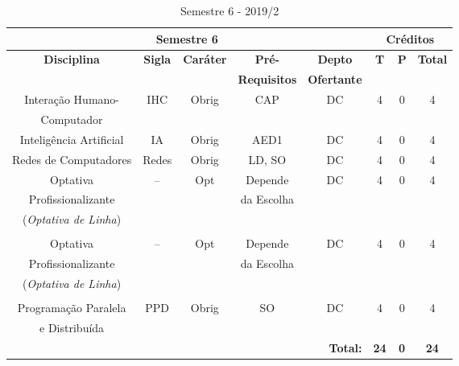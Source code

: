 
\begin{table}[H]
\caption{Semestre 6 - 2019/2}
\centering
\footnotesize
\begin{tabular}{|c|c|c|c|c|c|c|c|} %
\hline
\hline
\multicolumn{5}{|c|}{\textbf{Semestre 6}}  &  \multicolumn{3}{|c|}{\textbf{Créditos}} \\
\hline
\hline
\textbf{Disciplina} & \textbf{Sigla} & \textbf{Caráter} & \textbf{Pré-} & \textbf{Depto} &  \textbf{T}  &  \textbf{P}  & \textbf{Total} \\ 
& & & \textbf{Requisitos}  & \textbf{Ofertante} & & & \\
\hline 

Interação Humano- & IHC & Obrig & CAP & DC & 4 & 0 & 4 \\
Computador & & & & & & & \\
\hline

Inteligência Artificial & IA & Obrig & AED1 & DC & 4 & 0 & 4 \\
\hline

Redes de Computadores & Redes & Obrig & LD, SO & DC & 4 & 0 & 4 \\
\hline


Optativa & --  & Opt & Depende & DC  & 4 & 0 & 4 \\
Profissionalizante & & & da Escolha & & & & \\
(\textit{Optativa de Linha}) & & & & & & & \\
& & & & & & & \\
\hline

Optativa & --  & Opt & Depende & DC  & 4 & 0 & 4 \\
Profissionalizante & & & da Escolha & & & & \\
(\textit{Optativa de Linha}) & & & & & & & \\
& & & & & & & \\
\hline

Programação Paralela & PPD & Obrig & SO & DC  & 4 & 0 & 4 \\
e Distribuída & & & & & & & \\
\hline


\hline
\multicolumn{5}{|r|}{\textbf{Total:}}  &  \textbf{24}  &  \textbf{0}   & \textbf{24} \\ %
\hline
\hline
\end{tabular}
\label{tab:matriz4m2}
\end{table}



